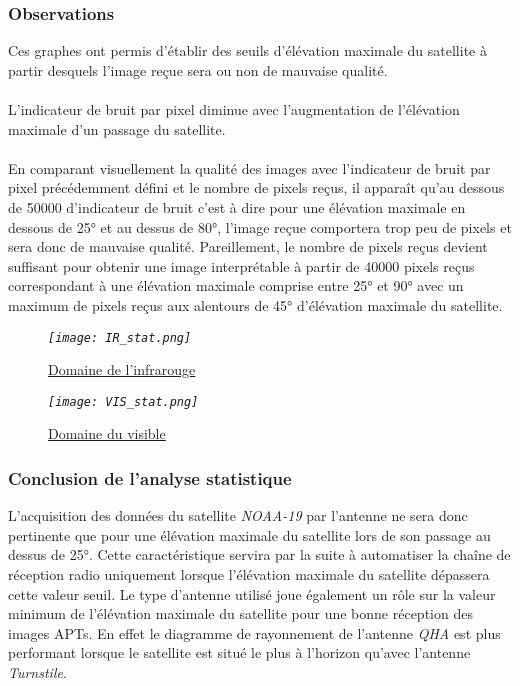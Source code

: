 \documentclass[12pt,fleqn]{book} %
\begin{document}
\subsubsection{Observations}
\noindent Ces graphes ont permis d'établir des seuils d'élévation maximale du satellite à partir desquels l'image reçue sera ou non de mauvaise qualité. 
~\\\\L'indicateur de bruit par pixel diminue avec l'augmentation de l'élévation maximale d'un passage du satellite.
~\\\\En comparant visuellement la qualité des images avec l'indicateur de bruit par pixel précédemment défini et le nombre de pixels reçus, il apparaît qu'au dessous de 50000 d'indicateur de bruit c'est à dire pour une élévation maximale en dessous de 25° et au dessus de 80°, l'image reçue comportera trop peu de pixels et sera donc de mauvaise qualité. Pareillement, le nombre de pixels reçus devient suffisant pour obtenir une image interprétable à partir de 40000 pixels reçus correspondant à une élévation maximale comprise entre 25° et 90° avec un maximum de pixels reçus aux alentours de 45° d'élévation maximale du satellite.  
\begin{figure}[H]
	\centering
	\itshape
	\texttt{[image: IR\_stat.png]}
	\caption{\label{IR_stat} \underline{Domaine de l'infrarouge}}
\end{figure}
\begin{figure}[H]
	\centering
	\itshape
	\texttt{[image: VIS\_stat.png]}
	\caption{\label{VIS_stat} \underline{Domaine du visible}}
\end{figure}
\subsubsection{Conclusion de l'analyse statistique}
\noindent L'acquisition des données du satellite \emph{NOAA-19} par l'antenne ne sera donc pertinente que pour une élévation maximale du satellite lors de son passage au dessus de 25°. Cette caractéristique servira par la suite à automatiser la chaîne de réception radio uniquement lorsque l'élévation maximale du satellite dépassera cette valeur seuil.
Le type d'antenne utilisé joue également un rôle sur la valeur minimum de l'élévation maximale du satellite pour une bonne réception des images APTs. En effet le diagramme de rayonnement de l'antenne \emph{QHA} est plus performant lorsque le satellite est situé le plus à l'horizon qu'avec l'antenne \emph{Turnstile}.
\end{document}
